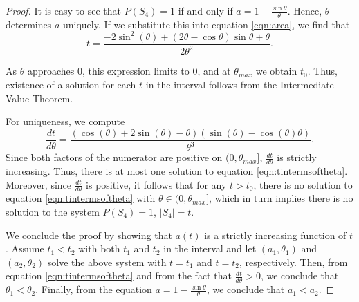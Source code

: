 \documentclass[leqno]{article}
\numberwithin{equation}{section}
\theoremstyle{definition}
\theoremstyle{remark}
\theoremstyle{plain}
\begin{document}
\begin{proof}
It is easy to see that $P(S_4)=1$ if and only if $a = 1-\frac{\sin\theta}{\theta}$. Hence, $\theta$ determines $a$ uniquely.  If we substitute this into equation \eqref{eqn:area}, we find that\begin{equation}\label{eqn:tintermsoftheta}t =\frac{-2 \sin^2 \left(\theta \right)+\left(2 \theta -\cos \theta \right) \sin\theta +\theta}{2 \theta^{2}}.\end{equation}

As $\theta$ approaches $0$, this expression limits to $0$, and at $\theta_{max}$ we obtain $t_0$.  Thus, existence of a solution for each $t$ in the interval follows from the Intermediate Value Theorem.

For uniqueness, we compute $$\frac{dt}{d\theta} = \frac{\left(\cos\! \left(\theta \right)+2 \sin\! \left(\theta \right)-\theta \right) \left(\sin\! \left(\theta \right)-\cos\! \left(\theta \right) \theta \right)}{\theta^{3}}.$$   Since both factors of the numerator are positive %
on $(0,\theta_{max}]$, $\frac{dt}{d\theta}$ is strictly increasing. Thus, there is at most one solution to equation \eqref{eqn:tintermsoftheta}.  Moreover, since $\frac{dt}{d\theta} $ is positive, it follows that for any $t > t_0$, there is no solution to equation \eqref{eqn:tintermsoftheta} with $\theta\in(0,\theta_{max}]$, which in turn implies there is no solution to the system $P(S_4) = 1$, $|S_4| = t$.

We conclude the proof by showing that $a(t)$ is a strictly increasing function of $t$.  Assume $t_1 < t_2$ with both $t_1$ and $t_2$ in the interval and let $(a_1,\theta_1)$ and $(a_2,\theta_2)$ solve the above system with $t= t_1$ and $t=t_2$, respectively.   Then, from equation \eqref{eqn:tintermsoftheta} and from the fact that $\frac{dt}{d\theta} > 0$, we conclude that $\theta_1<\theta_2$.  Finally, from the equation $a = 1-\frac{\sin\theta}{\theta}$, we conclude that $a_1 < a_2$.


\end{proof}
\end{document}
